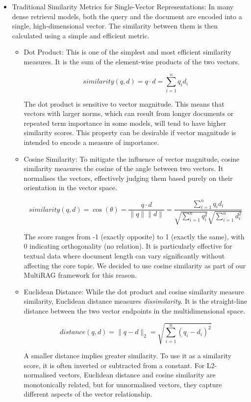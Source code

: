 \documentclass[12pt,twoside]{report}
\begin{document}
\begin{itemize}
\item{Traditional Similarity Metrics for Single-Vector Representations}: In many dense retrieval models, both the query and the document are encoded into a single, high-dimensional vector. The similarity between them is then calculated using a simple and efficient metric.

\begin{itemize}
\item{Dot Product}: This is one of the simplest and most efficient similarity measures. It is the sum of the element-wise products of the two vectors.

$$similarity(q, d) = q \cdot d = \sum_{i=1}^{n} q_i d_i$$

The dot product is sensitive to vector magnitude. This means that vectors with larger norms, which can result from longer documents or repeated term importance in some models, will tend to have higher similarity scores. This property can be desirable if vector magnitude is intended to encode a measure of importance.

\item{Cosine Similarity}: To mitigate the influence of vector magnitude, cosine similarity measures the cosine of the angle between two vectors. It normalises the vectors, effectively judging them based purely on their orientation in the vector space.

$$similarity(q, d) = \cos(\theta) = \frac{q \cdot d}{\|q\|\|d\|} = \frac{\sum_{i=1}^{n} q_i d_i}{\sqrt{\sum_{i=1}^{n} q_i^2} \sqrt{\sum_{i=1}^{n} d_i^2}}$$

The score ranges from -1 (exactly opposite) to 1 (exactly the same), with 0 indicating orthogonality (no relation). It is particularly effective for textual data where document length can vary significantly without affecting the core topic. We decided to use cosine similarity as part of our MultiRAG framework for this reason.

\item{Euclidean Distance}: While the dot product and cosine similarity measure similarity, Euclidean distance measures \textit{dissimilarity}. It is the straight-line distance between the two vector endpoints in the multidimensional space.

$$distance(q, d) = \|q - d\|_2 = \sqrt{\sum_{i=1}^{n} (q_i - d_i)^2}$$

A smaller distance implies greater similarity. To use it as a similarity score, it is often inverted or subtracted from a constant. For L2-normalised vectors, Euclidean distance and cosine similarity are monotonically related, but for unnormalised vectors, they capture different aspects of the vector relationship.
\end{itemize}



\end{itemize}
\end{document}
